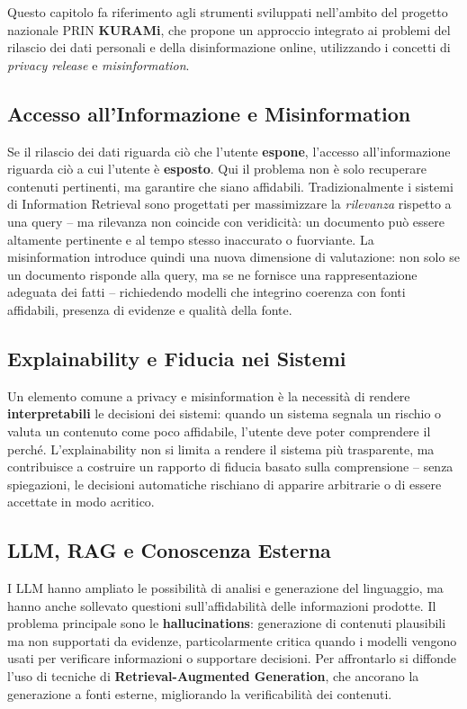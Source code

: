 \documentclass[12pt,a4paper]{article}
\begin{document}
Questo capitolo fa riferimento agli strumenti sviluppati nell'ambito del progetto nazionale PRIN \textbf{KURAMi}, che propone un approccio integrato ai problemi del rilascio dei dati personali e della disinformazione online, utilizzando i concetti di \emph{privacy release} e \emph{misinformation}.

\subsection{Accesso all'Informazione e Misinformation}

Se il rilascio dei dati riguarda ci\`o che l'utente \textbf{espone}, l'accesso all'informazione riguarda ci\`o a cui l'utente \`e \textbf{esposto}. Qui il problema non \`e solo recuperare contenuti pertinenti, ma garantire che siano affidabili. Tradizionalmente i sistemi di Information Retrieval sono progettati per massimizzare la \emph{rilevanza} rispetto a una query -- ma rilevanza non coincide con veridicit\`a: un documento pu\`o essere altamente pertinente e al tempo stesso inaccurato o fuorviante. La misinformation introduce quindi una nuova dimensione di valutazione: non solo se un documento risponde alla query, ma se ne fornisce una rappresentazione adeguata dei fatti -- richiedendo modelli che integrino coerenza con fonti affidabili, presenza di evidenze e qualit\`a della fonte.

\subsection{Explainability e Fiducia nei Sistemi}

Un elemento comune a privacy e misinformation \`e la necessit\`a di rendere \textbf{interpretabili} le decisioni dei sistemi: quando un sistema segnala un rischio o valuta un contenuto come poco affidabile, l'utente deve poter comprendere il perch\'e. L'explainability non si limita a rendere il sistema pi\`u trasparente, ma contribuisce a costruire un rapporto di fiducia basato sulla comprensione -- senza spiegazioni, le decisioni automatiche rischiano di apparire arbitrarie o di essere accettate in modo acritico.

\subsection{LLM, RAG e Conoscenza Esterna}

I LLM hanno ampliato le possibilit\`a di analisi e generazione del linguaggio, ma hanno anche sollevato questioni sull'affidabilit\`a delle informazioni prodotte. Il problema principale sono le \textbf{hallucinations}: generazione di contenuti plausibili ma non supportati da evidenze, particolarmente critica quando i modelli vengono usati per verificare informazioni o supportare decisioni. Per affrontarlo si diffonde l'uso di tecniche di \textbf{Retrieval-Augmented Generation}, che ancorano la generazione a fonti esterne, migliorando la verificabilit\`a dei contenuti.
\end{document}

